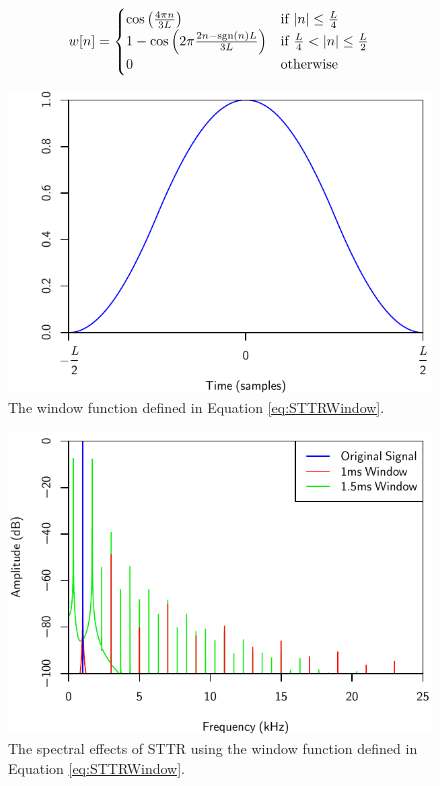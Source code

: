 			\begin{equation}
				w[n] = \begin{cases}
					\cos \left( \frac{4\pi n}{3L} \right) & \text{if $\left|n\right| \leq \frac{L}{4} $} \\
					1 - \cos \left( 2\pi \frac{2n - \operatorname{sgn}(n)L}{3L} \right) &
						\text{if $\frac{L}{4} < \left|n\right| \leq \frac{L}{2}$} \\
					0 & \text{otherwise}
				\end{cases}
				\label{eq:STTRWindow}
			\end{equation}

			\begin{figure}[h!]
				\centering
				\includegraphics{chapter5/Images/STTRWindow.pdf}
				\caption{The window function defined in Equation \ref{eq:STTRWindow}.}
				\label{fig:STTRWindow}
			\end{figure}

			\begin{figure}[h!]
				\centering
				\includegraphics{chapter5/Images/STTRSpectra.pdf}
				\caption{The spectral effects of STTR using the window function defined in Equation
				         \ref{eq:STTRWindow}.}
				\label{fig:STTRSpectra}
			\end{figure}

